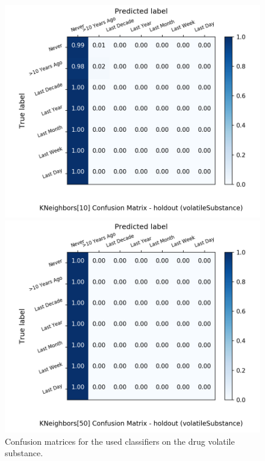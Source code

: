 \begin{figure}[H]
\begin{minipage}[b]{0.32\textwidth}
		\includegraphics[width=1.1\textwidth]{Plots/drugs/volatileSubstance_KNeighbors_10_balance_False_holdout.png}
  \end{minipage}
	\begin{minipage}[b]{0.32\textwidth}
		\includegraphics[width=1.1\textwidth]{Plots/drugs/volatileSubstance_KNeighbors_50_balance_False_holdout.png}
  \end{minipage}
	\caption{Confusion matrices for the used classifiers on the drug volatile substance.}
\end{figure}
